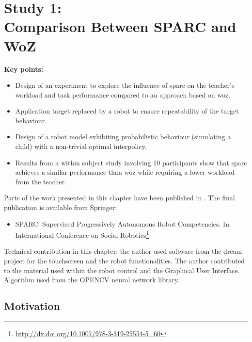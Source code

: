 \chapter[Study 1: Comparison Between SPARC and WoZ]{Study 1: \\ Comparison Between SPARC and WoZ}\label{chap:woz}
\glsresetall
\graphicspath{{images/woz/}}

\begin{framed}
	\textbf{Key points:}
	
	\begin{itemize}
		\item Design of an experiment to explore the influence of \acrshort{sparc} on the teacher's workload and task performance compared to an approach based on \acrshort{woz}.
		\item Application target replaced by a robot to ensure repeatability of the target behaviour.
		\item Design of a robot model exhibiting probabilistic behaviour (simulating a child) with a non-trivial optimal interpolicy.
		\item Results from a within subject study involving 10 participants show that \acrshort{sparc} achieves a similar performance than \acrshort{woz} while requiring a lower workload from the teacher.
	\end{itemize}
\end{framed}

Parts of the work presented in this chapter have been published in \cite{senft2015sparc}. The final publication is available from Springer:
\begin{itemize}
	\item SPARC: Supervised	Progressively Autonomous Robot Competencies. In International Conference on	Social Robotics\footnote{\url{http://dx.doi.org/10.1007/978-3-319-25554-5_60}}.
\end{itemize} 

Technical contribution in this chapter: the author used software from the \acrshort{dream} project for the touchscreen and the robot functionalities. The author contributed to the material used within the robot control and the Graphical User Interface. Algorithm used from the OPENCV neural network library.

\newpage

\section{Motivation}


